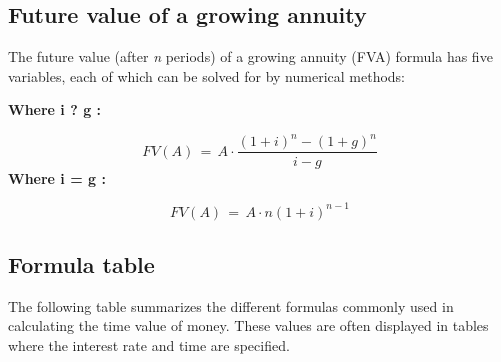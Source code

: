 \subsection{Future value of a growing annuity}
\label{sss:futu-899b}




The future value (after \textit{n} periods) of a growing annuity (FVA) formula has five
variables, each of which can be solved for by numerical methods:



\textbf{Where i ? g :}



$$FV(A) \,=\,A\cdot\frac{\left(1+i\right)^n-\left(1+g\right)^n}{i-g}$$ \textbf{Where i = g :}



$$FV(A) \,=\,A\cdot n(1+i)^{n-1}$$




\subsection{Formula table}
\label{sss:form-069f}




The following table summarizes the different formulas commonly used in calculating the
time value of money. These values are often displayed in tables where the interest rate
and time are specified.



